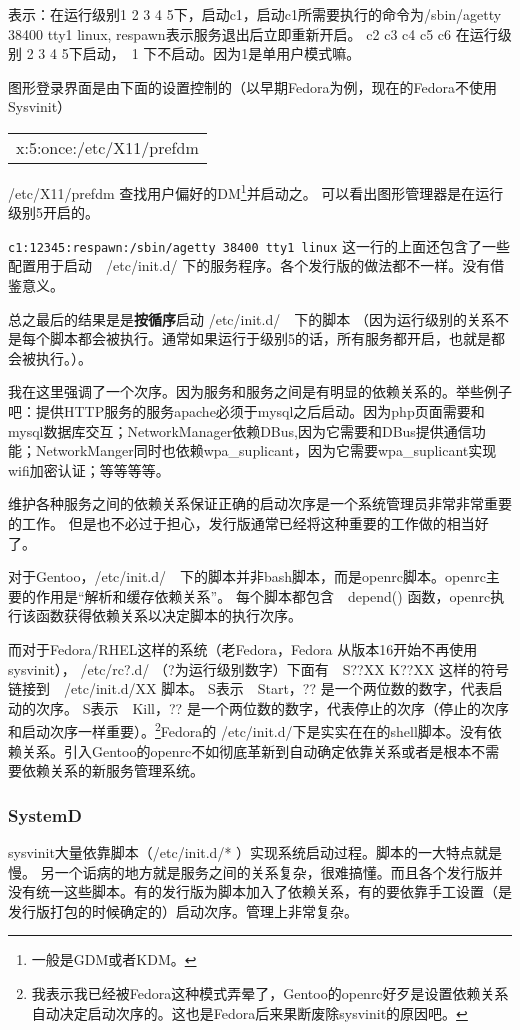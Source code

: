 \documentclass[amstex,twoside]{ctexbook}
\newenvironment{code}{\small\tt\begin{longtable}{p{0.8\textwidth}}}{\end{longtable}}
\begin{document}
表示：在运行级别1 2 3 4 5下，启动c1，启动c1所需要执行的命令为/sbin/agetty 38400 tty1 linux, respawn表示服务退出后立即重新开启。
c2 c3 c4 c5 c6 在运行级别 2 3 4 5下启动，　1 下不启动。因为1是单用户模式嘛。

图形登录界面是由下面的设置控制的（以早期Fedora为例，现在的Fedora不使用Sysvinit）
\begin{code}
x:5:once:/etc/X11/prefdm 
\end{code}
/etc/X11/prefdm 查找用户偏好的DM\footnote{一般是GDM或者KDM。}并启动之。
可以看出图形管理器是在运行级别5开启的。


{\tt c1:12345:respawn:/sbin/agetty 38400 tty1 linux} 这一行的上面还包含了一些配置用于启动　/etc/init.d/ 下的服务程序。各个发行版的做法都不一样。没有借鉴意义。

总之最后的结果是是\textbf{按循序}启动 /etc/init.d/　下的脚本
（因为运行级别的关系不是每个脚本都会被执行。通常如果运行于级别5的话，所有服务都开启，也就是都会被执行。）。

我在这里强调了一个次序。因为服务和服务之间是有明显的依赖关系的。举些例子吧：提供HTTP服务的服务apache必须于mysql之后启动。因为php页面需要和mysql数据库交互；NetworkManager依赖DBus,因为它需要和DBus提供通信功能；NetworkManger同时也依赖wpa\_suplicant，因为它需要wpa\_suplicant实现wifi加密认证；等等等等。

维护各种服务之间的依赖关系保证正确的启动次序是一个系统管理员非常非常重要的工作。
但是也不必过于担心，发行版通常已经将这种重要的工作做的相当好了。

对于Gentoo，/etc/init.d/　下的脚本并非bash脚本，而是openrc脚本。openrc主要的作用是“解析和缓存依赖关系”。
每个脚本都包含　depend() 函数，openrc执行该函数获得依赖关系以决定脚本的执行次序。

而对于Fedora/RHEL这样的系统（老Fedora，Fedora 从版本16开始不再使用sysvinit）， /etc/rc?.d/ （?为运行级别数字）下面有　S??XX K??XX 这样的符号链接到　/etc/init.d/XX 脚本。 %
S表示　Start，?? 是一个两位数的数字，代表启动的次序。
S表示　Kill，?? 是一个两位数的数字，代表停止的次序（停止的次序和启动次序一样重要）。\footnote{
我表示我已经被Fedora这种模式弄晕了，Gentoo的openrc好歹是设置依赖关系自动决定启动次序的。这也是Fedora后来果断废除sysvinit的原因吧。}Fedora的 /etc/init.d/下是实实在在的shell脚本。没有依赖关系。引入Gentoo的openrc不如彻底革新到自动确定依靠关系或者是根本不需要依赖关系的新服务管理系统。

\subsubsection{SystemD}
sysvinit大量依靠脚本（/etc/init.d/* ）实现系统启动过程。脚本的一大特点就是慢。
另一个诟病的地方就是服务之间的关系复杂，很难搞懂。而且各个发行版并没有统一这些脚本。有的发行版为脚本加入了依赖关系，有的要依靠手工设置（是发行版打包的时候确定的）启动次序。管理上非常复杂。
\end{document}
